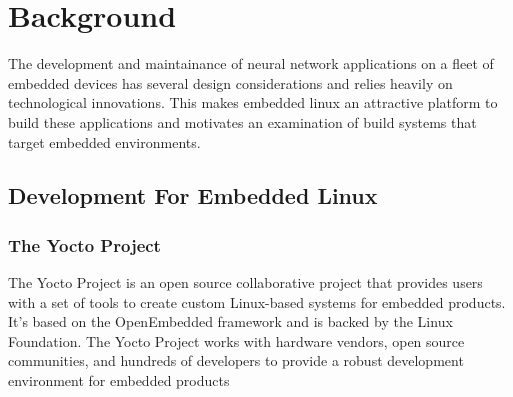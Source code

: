 


\chapter{Background}

The development and maintainance of neural network applications on a fleet of embedded devices has several design considerations and relies heavily on technological innovations. This makes embedded linux an attractive platform to build these applications and motivates an examination of build systems that target embedded environments.

\section[Development Process for Embedded Linux]{Development For Embedded Linux}

\subsection[Build Systems : The Yocto Project]{The Yocto Project}

The Yocto Project is an open source collaborative project that provides users with a set of tools to create custom Linux-based systems for embedded products. It's based on the OpenEmbedded framework and is backed by the Linux Foundation. The Yocto Project works with hardware vendors, open source communities, and hundreds of developers to provide a robust development environment for embedded products

